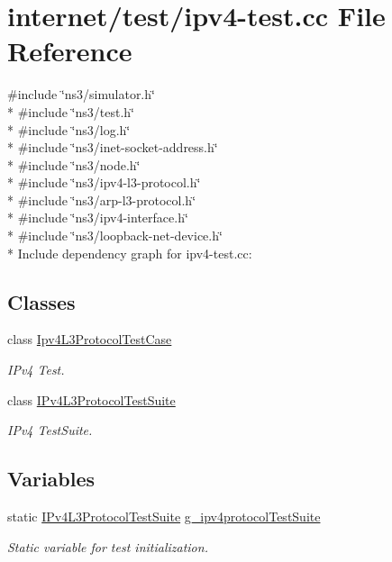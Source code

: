 \hypertarget{ipv4-test_8cc}{}\section{internet/test/ipv4-\/test.cc File Reference}
\label{ipv4-test_8cc}
{\ttfamily \#include \char`\"{}ns3/simulator.\+h\char`\"{}}\\*
{\ttfamily \#include \char`\"{}ns3/test.\+h\char`\"{}}\\*
{\ttfamily \#include \char`\"{}ns3/log.\+h\char`\"{}}\\*
{\ttfamily \#include \char`\"{}ns3/inet-\/socket-\/address.\+h\char`\"{}}\\*
{\ttfamily \#include \char`\"{}ns3/node.\+h\char`\"{}}\\*
{\ttfamily \#include \char`\"{}ns3/ipv4-\/l3-\/protocol.\+h\char`\"{}}\\*
{\ttfamily \#include \char`\"{}ns3/arp-\/l3-\/protocol.\+h\char`\"{}}\\*
{\ttfamily \#include \char`\"{}ns3/ipv4-\/interface.\+h\char`\"{}}\\*
{\ttfamily \#include \char`\"{}ns3/loopback-\/net-\/device.\+h\char`\"{}}\\*
Include dependency graph for ipv4-\/test.cc\+:
\subsection*{Classes}
\begin{DoxyCompactItemize}
\item 
class \hyperlink{classIpv4L3ProtocolTestCase}{Ipv4\+L3\+Protocol\+Test\+Case}
\begin{DoxyCompactList}\small\item\em I\+Pv4 Test. \end{DoxyCompactList}\item 
class \hyperlink{classIPv4L3ProtocolTestSuite}{I\+Pv4\+L3\+Protocol\+Test\+Suite}
\begin{DoxyCompactList}\small\item\em I\+Pv4 Test\+Suite. \end{DoxyCompactList}\end{DoxyCompactItemize}
\subsection*{Variables}
\begin{DoxyCompactItemize}
\item 
static \hyperlink{classIPv4L3ProtocolTestSuite}{I\+Pv4\+L3\+Protocol\+Test\+Suite} \hyperlink{ipv4-test_8cc_add9b9c9f2498275d0bd8cab061fc9aad}{g\+\_\+ipv4protocol\+Test\+Suite}
\begin{DoxyCompactList}\small\item\em Static variable for test initialization. \end{DoxyCompactList}\end{DoxyCompactItemize}


